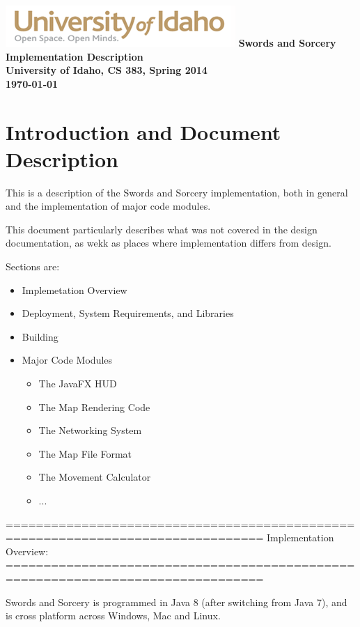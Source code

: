 \documentclass[12pt,a4paper]{article}
\begin{document}
\begin{titlepage}
    \centering
    \vfill
    \vfill
    \includegraphics{UIGraphic}
    \vfill
    {\bfseries\Large
        Swords and Sorcery Implementation Description\\
        University of Idaho, CS 383, Spring 2014\\
        \today
    }    
    \vfill
\end{titlepage}

\section{Introduction and Document Description}
This is a description of the Swords and Sorcery implementation, both in general
and the implementation of major code modules.

This document particularly describes what was not covered in the design
documentation, as wekk as places where implementation differs from design.

Sections are:
\begin{itemize}
\item Implemetation Overview
\item Deployment, System Requirements, and Libraries
\item Building
\item Major Code Modules
\begin{itemize}
	\item The JavaFX HUD	
	\item The Map Rendering Code
	\item The Networking System
	\item The Map File Format
	\item The Movement Calculator
	\item ...
\end{itemize}
\end{itemize}

================================================================================
Implementation Overview:
================================================================================

Swords and Sorcery is programmed in Java 8 (after switching from Java 7),
and is cross platform across Windows, Mac and Linux.
\end{document}
